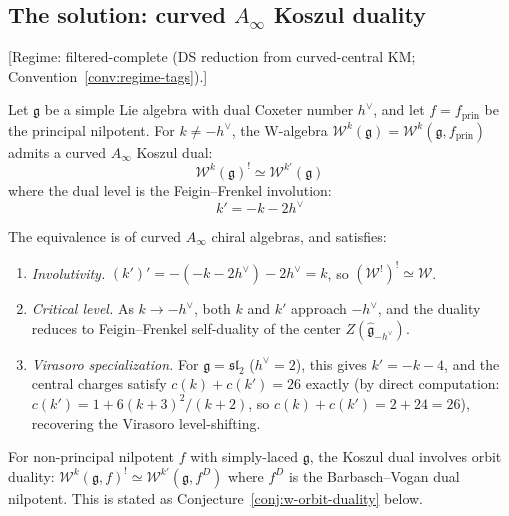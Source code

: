 \subsection{\texorpdfstring{The solution: curved $A_\infty$ Koszul duality}{The solution: curved A infty Koszul duality}}

\begin{theorem}\label{thm:w-algebra-koszul-main}
\textup{[Regime: filtered-complete \textup{(}DS reduction from curved-central KM;
Convention~\textup{\ref{conv:regime-tags})}.]}

Let $\mathfrak{g}$ be a simple Lie algebra with dual Coxeter number $h^\vee$, and let $f = f_{\mathrm{prin}}$ be the principal nilpotent.
For $k \neq -h^\vee$, the W-algebra $\mathcal{W}^k(\mathfrak{g}) = \mathcal{W}^k(\mathfrak{g}, f_{\mathrm{prin}})$ admits a curved $A_\infty$ Koszul dual:
\begin{equation}\label{eq:w-koszul-main}
\mathcal{W}^k(\mathfrak{g})^! \simeq \mathcal{W}^{k'}(\mathfrak{g})
\end{equation}
where the dual level is the Feigin--Frenkel involution:
\begin{equation}\label{eq:ff-level-shift}
k' = -k - 2h^\vee
\end{equation}

The equivalence is of curved $A_\infty$ chiral algebras, and satisfies:
\begin{enumerate}
\item \emph{Involutivity.} $(k')' = -(-k-2h^\vee) - 2h^\vee = k$, so $(\mathcal{W}^!)^! \simeq \mathcal{W}$.
\item \emph{Critical level.} As $k \to -h^\vee$, both $k$ and $k'$ approach $-h^\vee$, and the duality reduces to Feigin--Frenkel self-duality of the center $Z(\widehat{\mathfrak{g}}_{-h^\vee})$.
\item \emph{Virasoro specialization.} For $\mathfrak{g} = \mathfrak{sl}_2$ ($h^\vee = 2$), this gives $k' = -k-4$, and the central charges satisfy $c(k) + c(k') = 26$ exactly (by direct computation: $c(k') = 1 + 6(k+3)^2/(k+2)$, so $c(k)+c(k') = 2 + 24 = 26$), recovering the Virasoro level-shifting.
\end{enumerate}

For non-principal nilpotent $f$ with simply-laced $\mathfrak{g}$, the Koszul dual involves
orbit duality: $\mathcal{W}^k(\mathfrak{g},f)^! \simeq \mathcal{W}^{k'}(\mathfrak{g}, f^D)$ where $f^D$ is the Barbasch--Vogan dual nilpotent. This is stated as Conjecture~\ref{conj:w-orbit-duality} below.
\end{theorem}

